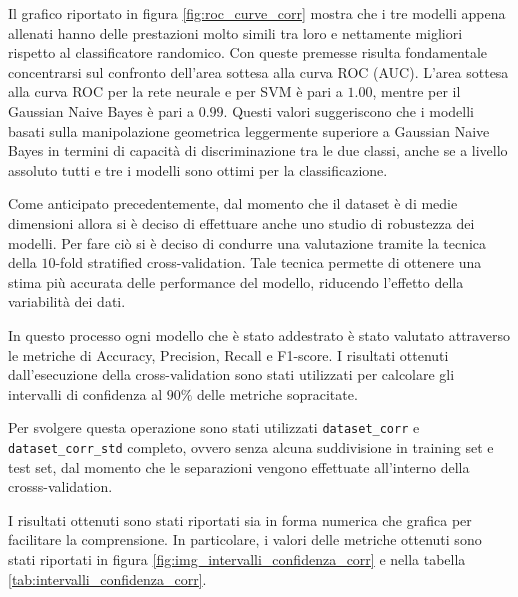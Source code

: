 Il grafico riportato in figura
\ref{fig:roc_curve_corr} mostra che i tre modelli appena allenati 
hanno delle prestazioni molto simili tra loro e nettamente migliori rispetto al 
classificatore randomico. Con queste premesse risulta fondamentale concentrarsi
sul confronto dell'area sottesa alla curva ROC (AUC). L'area sottesa alla curva ROC
per la rete neurale e per SVM è pari a $1.00$, mentre per il Gaussian Naive Bayes è pari a
$0.99$. Questi valori suggeriscono che i modelli basati sulla manipolazione geometrica
leggermente superiore a Gaussian Naive Bayes in termini di capacità di discriminazione tra le due
classi, anche se a livello assoluto tutti e tre i modelli sono ottimi per la 
classificazione.

Come anticipato precedentemente, dal momento che il dataset è di medie dimensioni
allora si è deciso di effettuare anche uno studio di robustezza dei modelli.
Per fare ciò si è deciso di condurre una valutazione tramite la tecnica della
$10$-fold stratified cross-validation. Tale tecnica permette di ottenere una
stima più accurata delle performance del modello, riducendo l'effetto della
variabilità dei dati.

In questo processo ogni modello che è stato addestrato è stato valutato attraverso
le metriche di Accuracy, Precision, Recall e F1-score. I risultati ottenuti
dall'esecuzione della cross-validation sono stati utilizzati per calcolare gli
intervalli di confidenza al $90\%$ delle metriche sopracitate.

Per svolgere questa operazione sono stati utilizzati \texttt{dataset\_corr} e
\texttt{dataset\_corr\_std} completo, ovvero senza alcuna suddivisione in training
set e test set, dal momento che le separazioni vengono effettuate all'interno 
della crosss-validation.

I risultati ottenuti sono stati riportati sia in forma numerica che grafica
per facilitare la comprensione. In particolare, i valori delle metriche ottenuti
sono stati riportati in figura \ref{fig:img_intervalli_confidenza_corr} e
nella tabella \ref{tab:intervalli_confidenza_corr}.

